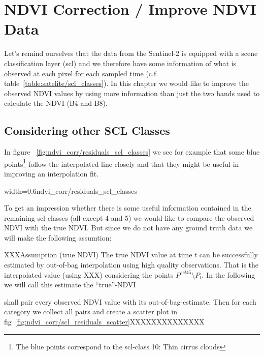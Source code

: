 \chapter{NDVI Correction / Improve NDVI Data}

Let's remind ourselves that the data from the Sentinel-2 is equipped with a scene classification layer (scl) and we therefore have some information of what is observed at each pixel for each sampled time (c.f. table~\ref{table:satelite/scl_classes}). In this chapter we would like to improve the observed NDVI values by using more information than just the two bands used to calculate the NDVI (B4 and B8).

\section{Considering other SCL Classes}
In figure ~\ref{fig:ndvi_corr/residuals_scl_classes} we see for example that some blue points\footnote{The blue points correspond to the scl-class 10: Thin cirrus clouds} follow the interpolated line closely and that they might be useful in improving an interpolation fit.

\begin{my_figure}[ht]{width=0.6\textwidth}{ndvi_corr/residuals_scl_classes}
    \caption{A smoothing splines fit considering green and yellow points (scl-classes 4 and 5)}
    \label{fig:ndvi_corr/residuals_scl_classes}
\end{my_figure}

To get an impression whether there is some useful information contained in the remaining scl-classes (all except 4 and 5) we would like to compare the observed NDVI with the true NDVI. But since we do not have any ground truth data we will make the following assumtion:


\begin{definition}{XXXAssumption (true NDVI)}
    The true NDVI value at time $t$ can be successfully estimated by out-of-bag interpolation using high quality observations. That is the interpolated value (using XXX) considering the points $P^{scl45}\setminus P_t$. In the following we will call this estimate the ``true''-NDVI
\end{definition}

shall pair every observed NDVI value with its out-of-bag-estimate. Then for each category we collect all pairs and create a scatter plot in fig~\ref{fig:ndvi_corr/scl_residuals_scatter}XXXXXXXXXXXXXX



